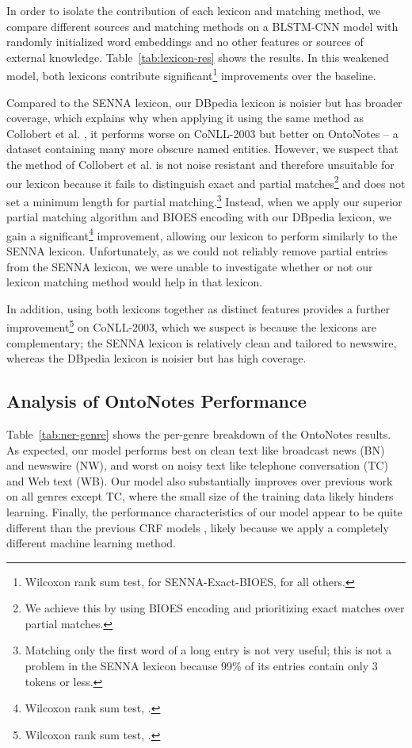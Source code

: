 \documentclass[11pt,letterpaper]{article}
\begin{document}
In order to isolate the contribution of each lexicon and matching method, we compare different sources and matching methods on a BLSTM-CNN model with randomly initialized word embeddings and no other features or sources of external knowledge. Table~\ref{tab:lexicon-res} shows the results. In this weakened model, both lexicons contribute significant\footnote{Wilcoxon rank sum test,  for SENNA-Exact-BIOES,  for all others.} improvements over the baseline.

Compared to the SENNA lexicon, our DBpedia lexicon is noisier but has broader coverage, which explains why when applying it using the same method as Collobert et al. , it performs worse on CoNLL-2003 but better on OntoNotes -- a dataset containing many more obscure named entities.
However, we suspect that the method of Collobert et al.  is not noise resistant and therefore unsuitable for our lexicon because it fails to distinguish exact and partial matches\footnote{We achieve this by using BIOES encoding and prioritizing exact matches over partial matches.} and does not set a minimum length for partial matching.\footnote{Matching only the first word of a long entry is not very useful; this is not a problem in the SENNA lexicon because 99\% of its entries contain only 3 tokens or less.}
Instead, when we apply our superior partial matching algorithm and BIOES encoding with our DBpedia lexicon, we gain a significant\footnote{Wilcoxon rank sum test, .} improvement, allowing our lexicon to perform similarly to the SENNA lexicon. 
Unfortunately, as we could not reliably remove partial entries from the SENNA lexicon, we were unable to investigate whether or not our lexicon matching method would help in that lexicon. 

In addition, using both lexicons together as distinct features provides a further improvement\footnote{Wilcoxon rank sum test, .} on CoNLL-2003, which we suspect is because the lexicons are complementary; the SENNA lexicon is relatively clean and tailored to newswire, whereas the DBpedia lexicon is noisier but has high coverage.





\subsection{Analysis of OntoNotes Performance}

Table~\ref{tab:ner-genre} shows the per-genre breakdown of the OntoNotes results. As expected, our model performs best on clean text like broadcast news (BN) and newswire (NW), and worst on noisy text like telephone conversation (TC) and Web text (WB). Our model also substantially improves over previous work on all genres except TC, where the small size of the training data likely hinders learning. Finally, the performance characteristics of our model appear to be quite different than the previous CRF models \cite{finkel2009,durrett2014}, likely because we apply a completely different machine learning method.
\end{document}
